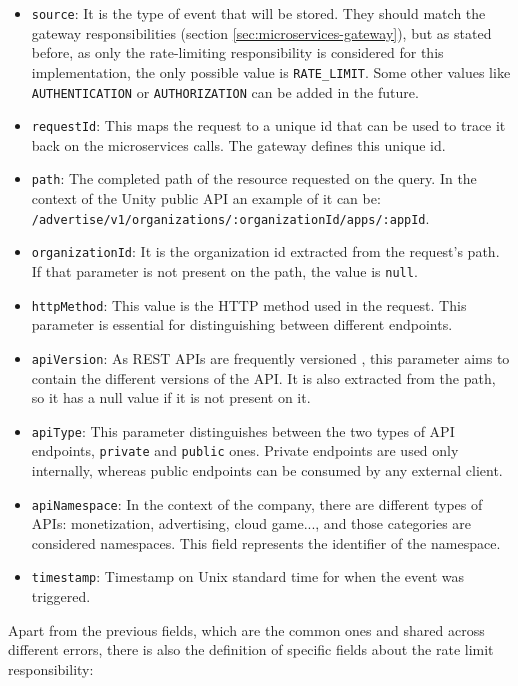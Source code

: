 \documentclass[english, 12pt, a4paper, sci, utf8, a-1b, online]{aaltothesis}
\begin{document}
\begin{itemize}
    \item \texttt{source}: It is the type of event that will be stored. They should match the gateway responsibilities (section \ref{sec:microservices-gateway}), but as stated before, as only the rate-limiting responsibility is considered for this implementation, the only possible value is \texttt{RATE\_LIMIT}. Some other values like \texttt{AUTHENTICATION} or \texttt{AUTHORIZATION} can be added in the future.
    \item \texttt{requestId}: This maps the request to a unique id that can be used to trace it back on the microservices calls. The gateway defines this unique id.
    \item \texttt{path}: The completed path of the resource requested on the query. In the context of the Unity public API an example of it can be: \\ \texttt{/advertise/v1/organizations/:organizationId/apps/:appId}.
    \item \texttt{organizationId}: It is the organization id extracted from the request's path. If that parameter is not present on the path, the value is \texttt{null}.
    \item \texttt{httpMethod}: This value is the HTTP method used in the request. This parameter is essential for distinguishing between different endpoints.
    \item \texttt{apiVersion}: As REST APIs are frequently versioned \cite{varga2016versioning}, this parameter aims to contain the different versions of the API. It is also extracted from the path, so it has a null value if it is not present on it.
    \item \texttt{apiType}: This parameter distinguishes between the two types of API endpoints, \texttt{private} and \texttt{public} ones. Private endpoints are used only internally, whereas public endpoints can be consumed by any external client.
    \item \texttt{apiNamespace}: In the context of the company, there are different types of APIs: monetization, advertising, cloud game..., and those categories are considered namespaces. This field represents the identifier of the namespace.
    \item \texttt{timestamp}: Timestamp on Unix standard time for when the event was triggered.
\end{itemize}

Apart from the previous fields, which are the common ones and shared across different errors, there is also the definition of specific fields about the rate limit responsibility:
\end{document}
